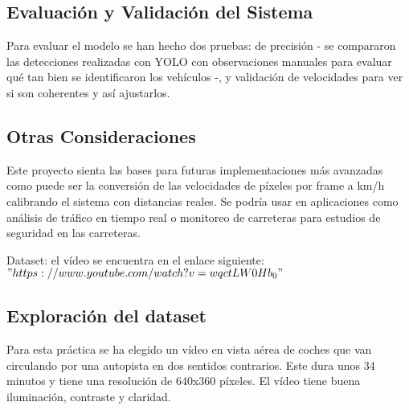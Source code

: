 \subsection{Evaluación y Validación del Sistema}
Para evaluar el modelo se han hecho dos pruebas: de precisión - se compararon las detecciones realizadas con YOLO con observaciones manuales para evaluar qué tan bien se identificaron los vehículos -, y validación de velocidades para ver si son coherentes y así ajustarlos.

\subsection{Otras Consideraciones}
Este proyecto sienta las bases para futuras implementaciones más avanzadas como puede ser la conversión de las velocidades de píxeles por frame a km/h calibrando el sistema con distancias reales. Se podría usar en aplicaciones como análisis de tráfico en tiempo real o monitoreo de carreteras para estudios de seguridad en las carreteras.


Dataset: el vídeo se encuentra en el enlace siguiente:
$"https://www.youtube.com/watch?v=wqctLW0Hb_0"$



\subsection{Exploración del dataset}
Para esta práctica se ha elegido un vídeo en vista aérea de coches que van circulando por una autopista en dos sentidos contrarios.  Este dura unos 34 minutos y tiene una resolución de 640x360 píxeles.
El vídeo tiene buena iluminación, contraste y claridad.



